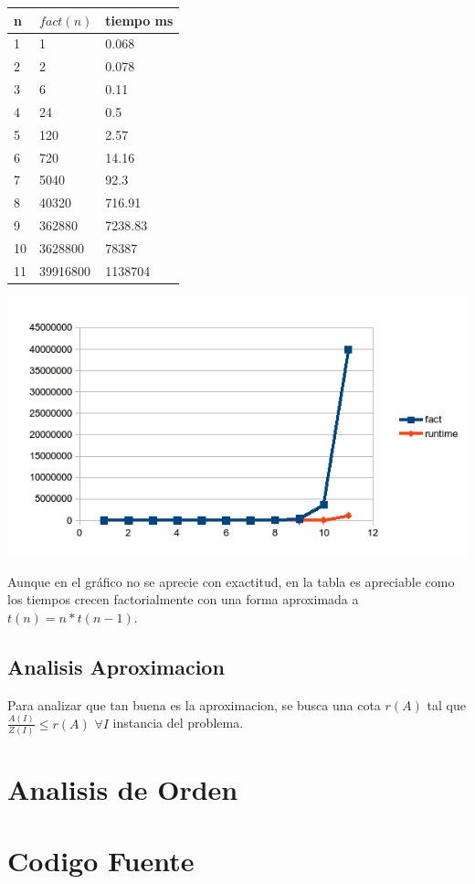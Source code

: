 \documentclass[12pt]{article}
\begin{document}
			\begin{center}
		 \begin{tabular}{|l|l|l|} \hline
		 	n &$fact(n)$ & tiempo ms \\ \hline
			1 & 1 & 0.068 \\ \hline
			2 & 2 & 0.078 \\ \hline
			3 & 6 & 0.11\\ \hline
			4 & 24 &  0.5\\ \hline
			5 & 120 &  2.57\\ \hline
			6 & 720 &  14.16\\ \hline
			7 & 5040 &  92.3\\ \hline
			8 & 40320 & 716.91\\ \hline
			9 & 362880 &  7238.83\\ \hline
			10 & 3628800&  78387\\ \hline
			11 & 39916800 & 1138704 \\ \hline
		\end{tabular}
		
		\includegraphics{graf.png}
	\end{center} 
		Aunque en el gráfico no se aprecie con exactitud, en la tabla es
		apreciable como los tiempos crecen factorialmente con una forma 
		aproximada a $t(n)=n*t(n-1)$.
	
	\newpage	
	
	\subsection{Analisis Aproximacion}
		Para analizar que tan buena es la aproximacion, se busca una cota
		$r(A)$ tal que $\displaystyle \frac{A(I)}{Z(I)} \leq r(A)$ $\forall I$ 
		instancia del problema.
	
\newpage
\section{Analisis de Orden}\label{sec:orden}		
		
\newpage
\section{Codigo Fuente}\label{sec:cf}
\end{document}
